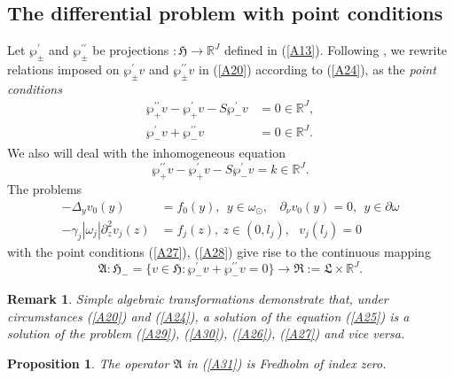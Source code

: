 \documentclass[11pt]{article}%
\newtheorem{proposition}[theorem]{Proposition}
\newtheorem{remark}[theorem]{Remark}
\numberwithin{equation}{section}
\begin{document}
\subsection{The differential problem with point conditions\label{sect2.4}}

Let $\wp_{\pm}^{\prime}$ and $\wp_{\pm}^{\prime\prime}$ be projections
$:\mathfrak{H}\rightarrow\mathbb{R}^{J}$ defined in (\ref{A13}). Following
\cite{na188, na239, na504}, we rewrite relations imposed on $\wp_{\pm}%
^{\prime}v$ and $\wp_{\pm}^{\prime\prime}v$ in (\ref{A20}) according to
(\ref{A24}), as the \textit{point conditions}
\begin{align}
\wp_{+}^{\prime\prime}v-\wp_{+}^{\prime}v-S\wp_{-}^{\prime}v  &
=0\in\mathbb{R}^{J},\label{A26}\\
\wp_{-}^{\prime}v+\wp_{-}^{\prime\prime}v  &  =0\in\mathbb{R}^{J}. \label{A27}%
\end{align}
We also will deal with the inhomogeneous equation%
\begin{equation}
\wp_{+}^{\prime\prime}v-\wp_{+}^{\prime}v-S\wp_{-}^{\prime}v=k\in
\mathbb{R}^{J}. \label{A28}%
\end{equation}
The problems%
\begin{align}
-\Delta_{y}v_{0}(y)  &  =f_{0}(y),\ \ y\in\omega_{\odot},\ \ \ \ \partial
_{\nu}v_{0}(y)=0,\ \ y\in\partial\omega\label{A29}\\
-\gamma_{j}|\omega_{j}|\partial_{z}^{2}v_{j}(z)  &  =f_{j}(z),\ z\in
(0,l_{j}),\ \ \ v_{j}(l_{j})=0 \label{A30}%
\end{align}
with the point conditions (\ref{A27}), (\ref{A28}) give rise to the continuous
mapping%
\begin{equation}
\mathfrak{A}:\mathfrak{H}_{-}=\{v\in\mathfrak{H}:\wp_{-}^{\prime}v+\wp
_{-}^{\prime\prime}v=0\}\rightarrow\mathfrak{R}:=\mathfrak{L}\times
\mathbb{R}^{J}. \label{A31}%
\end{equation}


\begin{remark}
\label{remEQU}Simple algebraic transformations demonstrate that, under
circumstances (\ref{A20}) and (\ref{A24}), a solution of the equation
(\ref{A25}) is a solution of the problem (\ref{A29}), (\ref{A30}),
(\ref{A26}), (\ref{A27}) and vice versa.
\end{remark}

\begin{proposition}
\label{prop5A}The operator $\mathfrak{A}$ in (\ref{A31}) is Fredholm of index zero.
\end{proposition}
\end{document}
